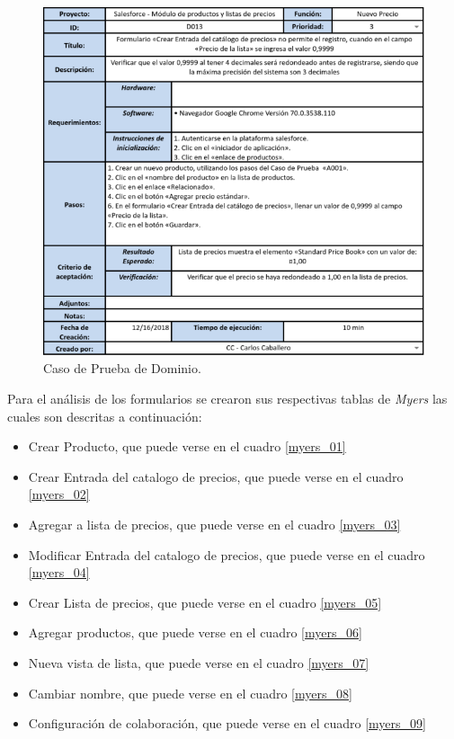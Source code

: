 \begin{figure}
\centering
\includegraphics[width=1.0\textwidth]{graphics/tc3-domain.eps}
\caption{Caso de Prueba de Dominio.}
\label{tc_domain}
\end{figure}

Para el análisis de los formularios se crearon sus respectivas tablas de
\emph{Myers} las cuales son descritas a continuación:

\begin{itemize}
\item Crear Producto, que puede verse en el cuadro \ref{myers_01}
\item Crear Entrada del catalogo de precios, que puede verse en el cuadro \ref{myers_02}
\item Agregar a lista de precios, que puede verse en el cuadro \ref{myers_03}
\item Modificar Entrada del catalogo de precios, que puede verse en el cuadro \ref{myers_04}
\item Crear Lista de precios, que puede verse en el cuadro \ref{myers_05}
\item Agregar productos, que puede verse en el cuadro \ref{myers_06}
\item Nueva vista de lista, que puede verse en el cuadro \ref{myers_07}
\item Cambiar nombre, que puede verse en el cuadro \ref{myers_08}
\item Configuración de colaboración, que puede verse en el cuadro \ref{myers_09}
\end{itemize}

